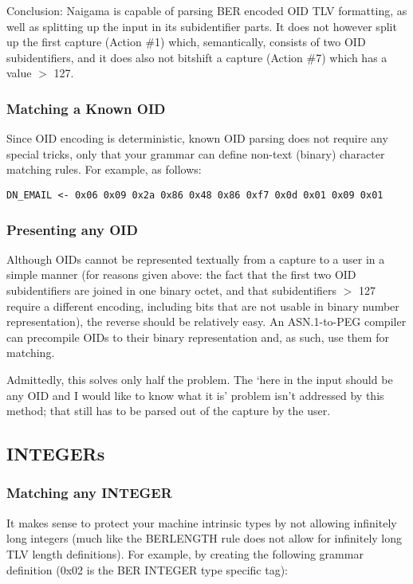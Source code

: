 Conclusion: Naigama is capable of parsing BER encoded OID TLV formatting, 
as well as splitting up the input in its subidentifier parts. It does not 
however split up the first capture (Action \#1) which, semantically, 
consists of two OID subidentifiers, and it does also not bitshift a 
capture (Action \#7) which has a value $>$ 127.

\subsubsection{Matching a Known OID}
\label{sec:work:oids:known}

Since OID encoding is deterministic, known OID parsing does not require 
any special tricks, only that your grammar can define non-text (binary) 
character matching rules. For example, as follows:

\begin{changemargin}{-60mm}{0mm}
\begin{myquote}
\begin{verbatim}
DN_EMAIL <- 0x06 0x09 0x2a 0x86 0x48 0x86 0xf7 0x0d 0x01 0x09 0x01
\end{verbatim}
\end{myquote}
\end{changemargin}

\subsubsection{Presenting any OID}
Although OIDs cannot be represented textually from a capture to a user in 
a simple manner (for reasons given above: the fact that the first two OID 
subidentifiers are joined in one binary octet, and that subidentifiers $>$ 
127 require a different encoding, including bits that are not usable in 
binary number representation), the reverse should be relatively easy. An 
ASN.1-to-PEG compiler can precompile OIDs to their binary representation 
and, as such, use them for matching.

Admittedly, this solves only half the problem. The ‘here in the input 
should be any OID and I would like to know what it is’ problem isn’t 
addressed by this method; that still has to be parsed out of the capture 
by the user.

\subsection{INTEGERs}

\subsubsection{Matching any INTEGER}
It makes sense to protect your machine intrinsic types by not allowing 
infinitely long integers (much like the BERLENGTH rule does not allow for 
infinitely long TLV length definitions). For example, by creating the 
following grammar definition (0x02 is the BER INTEGER type specific tag):

